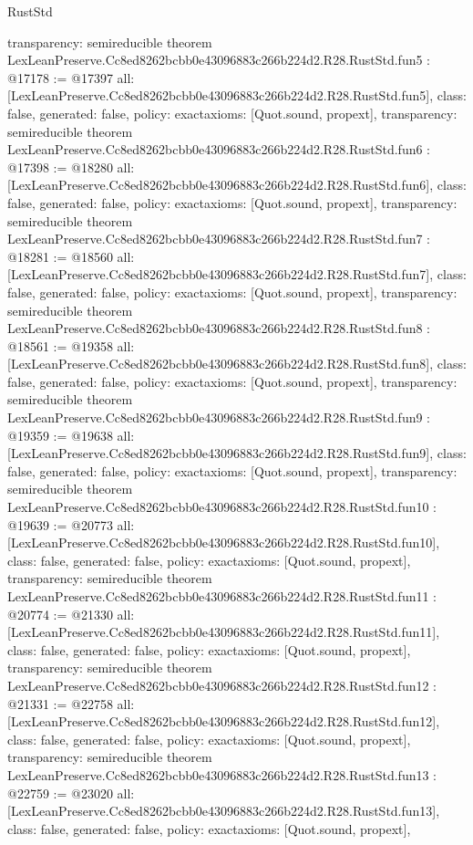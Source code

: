 \begin{lexlean}{RustStd}
\begin{coremodule}
{  transparency: semireducible
}
theorem LexLeanPreserve.Cc8ed8262bcbb0e43096883c266b224d2.R28.RustStd.fun5 : @17178 := @17397 {
  all: [LexLeanPreserve.Cc8ed8262bcbb0e43096883c266b224d2.R28.RustStd.fun5],
  class: false,
  generated: false,
  policy: exact{axioms: [Quot.sound, propext]},
  transparency: semireducible
}
theorem LexLeanPreserve.Cc8ed8262bcbb0e43096883c266b224d2.R28.RustStd.fun6 : @17398 := @18280 {
  all: [LexLeanPreserve.Cc8ed8262bcbb0e43096883c266b224d2.R28.RustStd.fun6],
  class: false,
  generated: false,
  policy: exact{axioms: [Quot.sound, propext]},
  transparency: semireducible
}
theorem LexLeanPreserve.Cc8ed8262bcbb0e43096883c266b224d2.R28.RustStd.fun7 : @18281 := @18560 {
  all: [LexLeanPreserve.Cc8ed8262bcbb0e43096883c266b224d2.R28.RustStd.fun7],
  class: false,
  generated: false,
  policy: exact{axioms: [Quot.sound, propext]},
  transparency: semireducible
}
theorem LexLeanPreserve.Cc8ed8262bcbb0e43096883c266b224d2.R28.RustStd.fun8 : @18561 := @19358 {
  all: [LexLeanPreserve.Cc8ed8262bcbb0e43096883c266b224d2.R28.RustStd.fun8],
  class: false,
  generated: false,
  policy: exact{axioms: [Quot.sound, propext]},
  transparency: semireducible
}
theorem LexLeanPreserve.Cc8ed8262bcbb0e43096883c266b224d2.R28.RustStd.fun9 : @19359 := @19638 {
  all: [LexLeanPreserve.Cc8ed8262bcbb0e43096883c266b224d2.R28.RustStd.fun9],
  class: false,
  generated: false,
  policy: exact{axioms: [Quot.sound, propext]},
  transparency: semireducible
}
theorem LexLeanPreserve.Cc8ed8262bcbb0e43096883c266b224d2.R28.RustStd.fun10 : @19639 := @20773 {
  all: [LexLeanPreserve.Cc8ed8262bcbb0e43096883c266b224d2.R28.RustStd.fun10],
  class: false,
  generated: false,
  policy: exact{axioms: [Quot.sound, propext]},
  transparency: semireducible
}
theorem LexLeanPreserve.Cc8ed8262bcbb0e43096883c266b224d2.R28.RustStd.fun11 : @20774 := @21330 {
  all: [LexLeanPreserve.Cc8ed8262bcbb0e43096883c266b224d2.R28.RustStd.fun11],
  class: false,
  generated: false,
  policy: exact{axioms: [Quot.sound, propext]},
  transparency: semireducible
}
theorem LexLeanPreserve.Cc8ed8262bcbb0e43096883c266b224d2.R28.RustStd.fun12 : @21331 := @22758 {
  all: [LexLeanPreserve.Cc8ed8262bcbb0e43096883c266b224d2.R28.RustStd.fun12],
  class: false,
  generated: false,
  policy: exact{axioms: [Quot.sound, propext]},
  transparency: semireducible
}
theorem LexLeanPreserve.Cc8ed8262bcbb0e43096883c266b224d2.R28.RustStd.fun13 : @22759 := @23020 {
  all: [LexLeanPreserve.Cc8ed8262bcbb0e43096883c266b224d2.R28.RustStd.fun13],
  class: false,
  generated: false,
  policy: exact{axioms: [Quot.sound, propext]},
}
\end{coremodule}
\end{lexlean}
